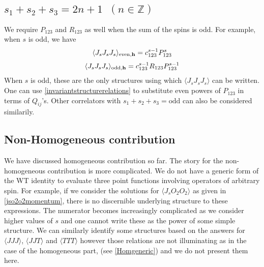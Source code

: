 \documentclass[a4paper,11pt]{article}
\begin{document}
 \subsection*{$s_1+s_2+s_3=2n+1\;\;(n \in \mathbb{Z})$}
 We require $P_{123}$ and $R_{123}$ as well when the sum of the spins is odd. For example, when $s$ is odd, we have
 \begin{align}
 \langle J_s J_s J_s\rangle_{\text{even}, \bf{h}} = c^{s-1}_{123} P^s_{123}
  \end{align}
  \begin{align}\label{sssinv}
   \langle J_s J_s J_s\rangle_{\text{odd}, \bf{h}} = c^{s-1}_{123} R_{123} P^{s-1}_{123}
   \end{align}
   When $s$ is odd, these are the only structures using which $\langle J_s J_s J_s \rangle$ can be written. One can use \eqref{invariantstructurerelations} to substitute even powers of $P_{123}$ in terms of $Q_{ij}$'s. Other correlators with $s_1+s_2+s_3=\text{odd}$ can also be considered similarily.
\subsection*{Non-Homogeneous contribution}
We have discussed homogeneous contribution so far. The story for the non-homogeneous contribution is more complicated. We do not have a generic form of the WT identity to evaluate three point functions involving operators of arbitrary spin. For example, if we consider the solutions for $\langle J_s O_2 O_2 \rangle$ as given in \eqref{jso2o2momentum}, there is no discernible underlying structure to these expressions. The numerator becomes increasingly complicated as we consider higher values of $s$ and one cannot write these as the power of some simple structure.
We can similarly identify some structures based on the answers for $\langle J J J \rangle$, $\langle J J T \rangle$ and $\langle TTT \rangle$ however those relations are not illuminating  as in the case of the homogeneous part, (see \eqref{Homgeneric}) and we do not present them here.



\end{document}
